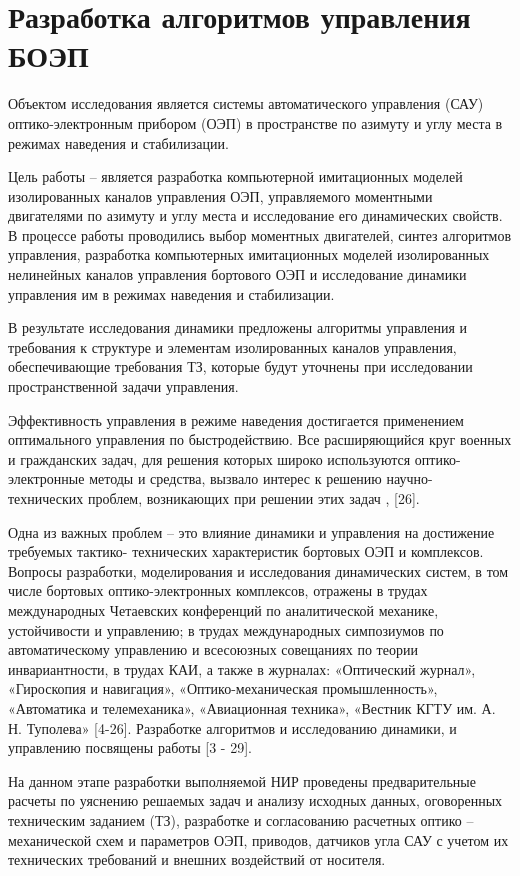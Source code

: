 \chapter{Разработка алгоритмов управления БОЭП} \label{ch:ch4}

Объектом исследования является системы автоматического управления (САУ) оптико-электронным прибором (ОЭП) в пространстве по азимуту и углу места в режимах наведения и стабилизации.

Цель работы – является разработка компьютерной имитационных моделей изолированных каналов управления ОЭП, управляемого моментными двигателями по азимуту и углу места и исследование его динамических свойств.
В процессе работы проводились выбор моментных двигателей, синтез алгоритмов управления, разработка компьютерных имитационных моделей изолированных нелинейных каналов управления бортового ОЭП и исследование динамики управления им в режимах наведения и стабилизации.

В результате исследования динамики предложены алгоритмы управления и требования к структуре и элементам изолированных каналов управления, обеспечивающие требования ТЗ, которые будут уточнены при исследовании пространственной задачи управления.

Эффективность управления в режиме наведения достигается применением оптимального управления по быстродействию. 
Все расширяющийся круг военных и гражданских задач, для решения которых широко используются оптико-электронные методы и средства, вызвало интерес к решению научно- технических   проблем, возникающих при решении этих задач \cite[]{Tarasov}, \cite[]{BLDC} [26].

Одна из важных проблем – это влияние динамики и управления на достижение требуемых тактико- технических характеристик бортовых ОЭП и комплексов. Вопросы разработки, моделирования и исследования динамических систем, в том числе бортовых оптико-электронных комплексов, отражены в трудах международных Четаевских конференций по аналитической механике, устойчивости и управлению; в трудах международных симпозиумов по автоматическому управлению и всесоюзных совещаниях по теории инвариантности, в трудах КАИ, а также в журналах: «Оптический журнал», «Гироскопия и навигация», «Оптико-механическая промышленность», «Автоматика и телемеханика», «Авиационная техника», «Вестник КГТУ им. А. Н. Туполева» [4-26]. Разработке алгоритмов и исследованию динамики, и управлению посвящены работы [3 - 29].

На данном этапе разработки выполняемой НИР проведены предварительные расчеты по уяснению решаемых задач и анализу исходных данных, оговоренных техническим заданием (ТЗ), разработке и согласованию
расчетных оптико – механической схем и параметров ОЭП, приводов, датчиков угла САУ с учетом их технических требований и внешних воздействий от носителя.


